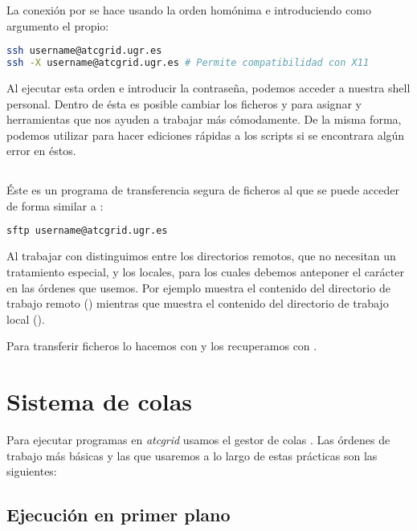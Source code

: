 La conexión por  se hace usando la orden homónima e introduciendo como argumento el  propio:

\begin{lstlisting}[language=sh]
ssh username@atcgrid.ugr.es
ssh -X username@atcgrid.ugr.es # Permite compatibilidad con X11
\end{lstlisting}

Al ejecutar esta orden e introducir la contraseña, podemos acceder a nuestra shell personal.
Dentro de ésta es posible cambiar los ficheros  y  para asignar  y herramientas que nos ayuden a trabajar más cómodamente.
De la misma forma, podemos utilizar  para hacer ediciones rápidas a los scripts si se encontrara algún error en éstos.

\subsection{}

Éste es un programa de transferencia segura de ficheros al que se puede acceder de forma similar a :

\begin{lstlisting}[language=sh]
sftp username@atcgrid.ugr.es
\end{lstlisting}

Al trabajar con  distinguimos entre los directorios remotos, que no necesitan un tratamiento especial, y los locales, para los cuales debemos anteponer el carácter  en las órdenes que usemos.
Por ejemplo  muestra el contenido del directorio de trabajo remoto () mientras que  muestra el contenido del directorio de trabajo local ().

Para transferir ficheros lo hacemos con  y los recuperamos con .

\section{Sistema de colas}

Para ejecutar programas en \textit{atcgrid} usamos el gestor de colas \href{https://slurm.schedmd.com/pdfs/summary.pdf}{}.
Las órdenes de trabajo más básicas y las que usaremos a lo largo de estas prácticas son las siguientes:

\subsection{Ejecución en primer plano}

